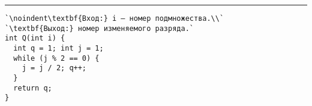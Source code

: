 \vspace{5pt} \hrule
\begin{lstlisting}[caption={Функция Q определения номера изменяемого разряда}, label=p40_Q, escapechar=`]
`\noindent\textbf{Вход:} i — номер подмножества.\\`
`\textbf{Выход:} номер изменяемого разряда.`
int Q(int i) {
  int q = 1; int j = 1;
  while (j % 2 == 0) {
    j = j / 2; q++;
  }
  return q;
}
\end{lstlisting}
